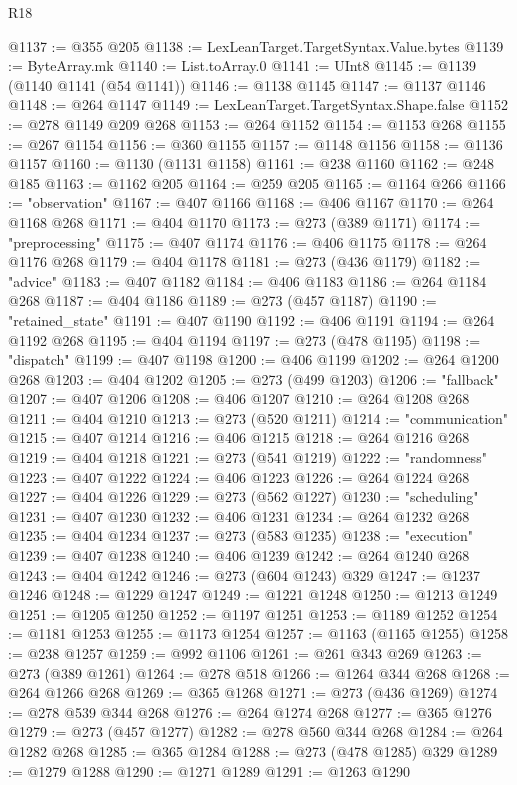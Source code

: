 \begin{lexlean}{R18}
\begin{coremodule}
{{{{{{{{{{{{{{{{{{{{{{{{{{{{{{{{{{{{{{{{{{{{{{{{{{{{{{{{{{{{{{{{{{{{{{{{{{{{{{{{{{{{{{{{{{{{{{{{{{{{{{{{{{{{{{{{{{{{{{{{{{{{{{{{{{{{{{{{{{{{{{{@1137 := @355 @205
@1138 := LexLeanTarget.TargetSyntax.Value.bytes
@1139 := ByteArray.mk
@1140 := List.toArray.{0}
@1141 := UInt8
@1145 := @1139 (@1140 @1141 (@54 @1141))
@1146 := @1138 @1145
@1147 := @1137 @1146
@1148 := @264 @1147
@1149 := LexLeanTarget.TargetSyntax.Shape.false
@1152 := @278 @1149 @209 @268
@1153 := @264 @1152
@1154 := @1153 @268
@1155 := @267 @1154
@1156 := @360 @1155
@1157 := @1148 @1156
@1158 := @1136 @1157
@1160 := @1130 (@1131 @1158)
@1161 := @238 @1160
@1162 := @248 @185
@1163 := @1162 @205
@1164 := @259 @205
@1165 := @1164 @266
@1166 := "observation"
@1167 := @407 @1166
@1168 := @406 @1167
@1170 := @264 @1168 @268
@1171 := @404 @1170
@1173 := @273 (@389 @1171)
@1174 := "preprocessing"
@1175 := @407 @1174
@1176 := @406 @1175
@1178 := @264 @1176 @268
@1179 := @404 @1178
@1181 := @273 (@436 @1179)
@1182 := "advice"
@1183 := @407 @1182
@1184 := @406 @1183
@1186 := @264 @1184 @268
@1187 := @404 @1186
@1189 := @273 (@457 @1187)
@1190 := "retained_state"
@1191 := @407 @1190
@1192 := @406 @1191
@1194 := @264 @1192 @268
@1195 := @404 @1194
@1197 := @273 (@478 @1195)
@1198 := "dispatch"
@1199 := @407 @1198
@1200 := @406 @1199
@1202 := @264 @1200 @268
@1203 := @404 @1202
@1205 := @273 (@499 @1203)
@1206 := "fallback"
@1207 := @407 @1206
@1208 := @406 @1207
@1210 := @264 @1208 @268
@1211 := @404 @1210
@1213 := @273 (@520 @1211)
@1214 := "communication"
@1215 := @407 @1214
@1216 := @406 @1215
@1218 := @264 @1216 @268
@1219 := @404 @1218
@1221 := @273 (@541 @1219)
@1222 := "randomness"
@1223 := @407 @1222
@1224 := @406 @1223
@1226 := @264 @1224 @268
@1227 := @404 @1226
@1229 := @273 (@562 @1227)
@1230 := "scheduling"
@1231 := @407 @1230
@1232 := @406 @1231
@1234 := @264 @1232 @268
@1235 := @404 @1234
@1237 := @273 (@583 @1235)
@1238 := "execution"
@1239 := @407 @1238
@1240 := @406 @1239
@1242 := @264 @1240 @268
@1243 := @404 @1242
@1246 := @273 (@604 @1243) @329
@1247 := @1237 @1246
@1248 := @1229 @1247
@1249 := @1221 @1248
@1250 := @1213 @1249
@1251 := @1205 @1250
@1252 := @1197 @1251
@1253 := @1189 @1252
@1254 := @1181 @1253
@1255 := @1173 @1254
@1257 := @1163 (@1165 @1255)
@1258 := @238 @1257
@1259 := @992 @1106
@1261 := @261 @343 @269
@1263 := @273 (@389 @1261)
@1264 := @278 @518
@1266 := @1264 @344 @268
@1268 := @264 @1266 @268
@1269 := @365 @1268
@1271 := @273 (@436 @1269)
@1274 := @278 @539 @344 @268
@1276 := @264 @1274 @268
@1277 := @365 @1276
@1279 := @273 (@457 @1277)
@1282 := @278 @560 @344 @268
@1284 := @264 @1282 @268
@1285 := @365 @1284
@1288 := @273 (@478 @1285) @329
@1289 := @1279 @1288
@1290 := @1271 @1289
@1291 := @1263 @1290
}}}}}}}}}}}}}}}}}}}}}}}}}}}}}}}}}}}}}}}}}}}}}}}}}}}}}}}}}}}}}}}}}}}}}}}}}}}}}}}}}}}}}}}}}}}}}}}}}}}}}}}}}}}}}}}}}}}}}}}}}}}}}}}}}}}}}}}}}}}}}}}
\end{coremodule}
\end{lexlean}
